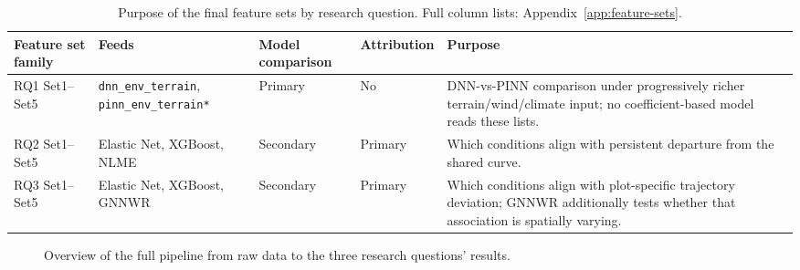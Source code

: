\documentclass[11pt,a4paper]{report}
\begin{document}
\begin{table}[!htbp]
\centering
\scriptsize
\renewcommand{\arraystretch}{1.2}
\begin{tabular}{p{2.3cm}p{3.6cm}p{1.6cm}p{2cm}p{4cm}}
\toprule
Feature set family & Feeds & Model comparison & Attribution & Purpose \\
\midrule
RQ1 Set1--Set5 & \texttt{dnn\_env\_terrain}, \texttt{pinn\_env\_terrain*} & Primary & No & DNN-vs-PINN
comparison under progressively richer terrain/wind/climate input; no coefficient-based model
reads these lists. \\
RQ2 Set1--Set5 & Elastic Net, XGBoost, NLME & Secondary & Primary & Which conditions align with
persistent departure from the shared curve. \\
RQ3 Set1--Set5 & Elastic Net, XGBoost, GNNWR & Secondary & Primary & Which conditions align with
plot-specific trajectory deviation; GNNWR additionally tests whether that association is
spatially varying. \\
\bottomrule
\end{tabular}
\caption{Purpose of the final feature sets by research question. Full column lists: Appendix~\ref{app:feature-sets}.}
\label{tab:feature-set-purpose}
\end{table}

\begin{figure}[!htbp]
\centering
{}
\caption{Overview of the full pipeline from raw data to the three research questions' results.}
\label{fig:pipeline-overview}
\end{figure}
\end{document}
